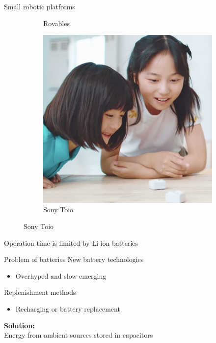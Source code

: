 \documentclass{beamer}
\begin{document}
\begin{frame}{Small robotic platforms}
\begin{figure}
\begin{subfigure}[b]{0.324\textwidth}
			\caption*{Rovables}
		\end{subfigure}
		\begin{subfigure}[b]{0.323\textwidth}
			\includegraphics[width=\textwidth]{pics/toio.jpg}
			\caption*{Sony Toio}
		\end{subfigure}
	\end{figure}
	Operation time is limited by Li-ion batteries
\end{frame}

\begin{frame}{Problem of batteries}
	New battery technologies
	\begin{itemize}
		\item Overhyped and slow emerging
	\end{itemize}
	\vspace{0.5em}
	Replenishment methods
	\begin{itemize}
		\item Recharging or battery replacement
	\end{itemize}
	\vspace{2em}
	\pause
	\textbf{Solution:} \\
	Energy from ambient sources stored in capacitors
\end{frame}
\end{document}
